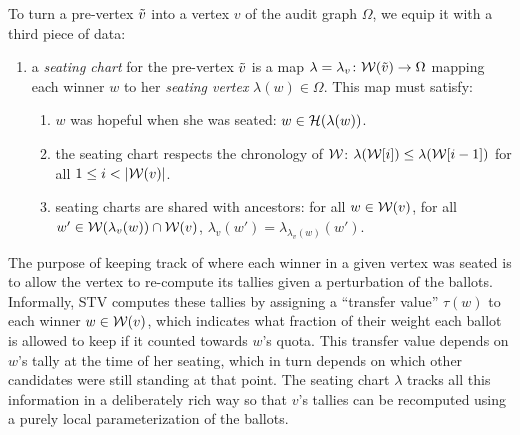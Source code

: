 To turn a pre-vertex $\tilde{v}$ into a vertex $v$ of the audit graph $\Omega$, we equip it with a third piece of data:
\begin{enumerate}
	\item[3.] a \emph{seating chart} for the pre-vertex $\tilde{v}$ is a map $\lambda = \lambda_v \colon \mathcal{W}(\tilde{v})\to\Omega$ mapping each winner $w$ to her \emph{seating vertex} $\lambda(w)\in\Omega$. This map must satisfy:
		\begin{enumerate}
		    \item $w$ was hopeful when she was seated: $w\in \mathcal{H}(\lambda(w))$.
		    \item the seating chart respects the chronology of $\mathcal{W}$: $\lambda(\mathcal{W}[i]) \leq \lambda(\mathcal{W}[i-1])$ for all $1\leq i < |\mathcal{W}(v)|$.
		    \item seating charts are shared with ancestors: for all $w \in \mathcal{W}(v)$, for all $w'\in \mathcal{W}(\lambda_v(w))\cap \mathcal{W}(v)$, $\lambda_v(w')=\lambda_{\lambda_v(w)}(w')$.
		\end{enumerate}
\end{enumerate}
The purpose of keeping track of where each winner in a given vertex was seated is to allow the vertex to re-compute its tallies given a perturbation of the ballots.
Informally, STV computes these tallies by assigning a ``transfer value'' $\tau(w)$ to each winner $w\in\mathcal{W}(v)$, which indicates what fraction of their weight each ballot is allowed to keep if it counted towards $w$'s quota.
This transfer value depends on $w$'s tally at the time of her seating, which in turn depends on which other candidates were still standing at that point. 
The seating chart $\lambda$ tracks all this information in a deliberately rich way so that $v$'s tallies can be recomputed using a purely local parameterization of the ballots.

